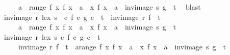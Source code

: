 \begin{isabellebody}
\ \ \ \ {\isacharparenleft}{\kern0pt}{\isasymUnion}\ a\ {\isasymin}\ range\ f{\isachardot}{\kern0pt}\ {\isacharparenleft}{\kern0pt}{\isacharbraceleft}{\kern0pt}x{\isachardot}{\kern0pt}\ f\ x\ {\isacharequal}{\kern0pt}\ a{\isacharbraceright}{\kern0pt}\ {\isasymtimes}\ {\isacharbraceleft}{\kern0pt}x{\isachardot}{\kern0pt}\ f\ x\ {\isacharequal}{\kern0pt}\ a{\isacharbraceright}{\kern0pt}\ {\isasyminter}\ {\isacharparenleft}{\kern0pt}inv{\isacharunderscore}{\kern0pt}image\ s\ g{\isacharparenright}{\kern0pt}{\isacharparenright}{\kern0pt}{\isacharparenright}{\kern0pt}\ {\isasyminter}\ t{\isachardoublequoteclose}\ \isamarkupfalse%
\ blast\ \isanewline
\ \ \isamarkupfalse%
\ {\isachardoublequoteopen}{\isacharparenleft}{\kern0pt}inv{\isacharunderscore}{\kern0pt}image\ {\isacharparenleft}{\kern0pt}r\ {\isacharless}{\kern0pt}{\isacharasterisk}{\kern0pt}lex{\isacharasterisk}{\kern0pt}{\isachargreater}{\kern0pt}\ s{\isacharparenright}{\kern0pt}\ {\isacharparenleft}{\kern0pt}{\isasymlambda}\ c{\isachardot}{\kern0pt}\ {\isacharparenleft}{\kern0pt}f\ c{\isacharcomma}{\kern0pt}\ g\ c{\isacharparenright}{\kern0pt}{\isacharparenright}{\kern0pt}{\isacharparenright}{\kern0pt}\ {\isasyminter}\ t\ {\isacharequal}{\kern0pt}\ {\isacharparenleft}{\kern0pt}inv{\isacharunderscore}{\kern0pt}image\ r\ f\ {\isasyminter}\ t{\isacharparenright}{\kern0pt}\ {\isasymunion}\isanewline
\ \ \ \ {\isacharparenleft}{\kern0pt}{\isasymUnion}\ a\ {\isasymin}\ range\ f{\isachardot}{\kern0pt}\ {\isacharbraceleft}{\kern0pt}x{\isachardot}{\kern0pt}\ f\ x\ {\isacharequal}{\kern0pt}\ a{\isacharbraceright}{\kern0pt}\ {\isasymtimes}\ {\isacharbraceleft}{\kern0pt}x{\isachardot}{\kern0pt}\ f\ x\ {\isacharequal}{\kern0pt}\ a{\isacharbraceright}{\kern0pt}\ {\isasyminter}\ {\isacharparenleft}{\kern0pt}inv{\isacharunderscore}{\kern0pt}image\ s\ g{\isacharparenright}{\kern0pt}\ {\isasyminter}\ t{\isacharparenright}{\kern0pt}{\isachardoublequoteclose}\isanewline
\ \ \isamarkupfalse%
\isanewline
\ \ \ \ \isamarkupfalse%
\ {\isachardoublequoteopen}inv{\isacharunderscore}{\kern0pt}image\ {\isacharparenleft}{\kern0pt}r\ {\isacharless}{\kern0pt}{\isacharasterisk}{\kern0pt}lex{\isacharasterisk}{\kern0pt}{\isachargreater}{\kern0pt}\ s{\isacharparenright}{\kern0pt}\ {\isacharparenleft}{\kern0pt}{\isasymlambda}c{\isachardot}{\kern0pt}\ {\isacharparenleft}{\kern0pt}f\ c{\isacharcomma}{\kern0pt}\ g\ c{\isacharparenright}{\kern0pt}{\isacharparenright}{\kern0pt}\ {\isasyminter}\ t\isanewline
\ \ \ \ {\isasymsubseteq}\ inv{\isacharunderscore}{\kern0pt}image\ r\ f\ {\isasyminter}\ t\ {\isasymunion}\ {\isacharparenleft}{\kern0pt}{\isasymUnion}a{\isasymin}range\ f{\isachardot}{\kern0pt}\ {\isacharbraceleft}{\kern0pt}x{\isachardot}{\kern0pt}\ f\ x\ {\isacharequal}{\kern0pt}\ a{\isacharbraceright}{\kern0pt}\ {\isasymtimes}\ {\isacharbraceleft}{\kern0pt}x{\isachardot}{\kern0pt}\ f\ x\ {\isacharequal}{\kern0pt}\ a{\isacharbraceright}{\kern0pt}\ {\isasyminter}\ inv{\isacharunderscore}{\kern0pt}image\ s\ g\ {\isasyminter}\ t{\isacharparenright}{\kern0pt}{\isachardoublequoteclose}\isanewline

\end{isabellebody}
